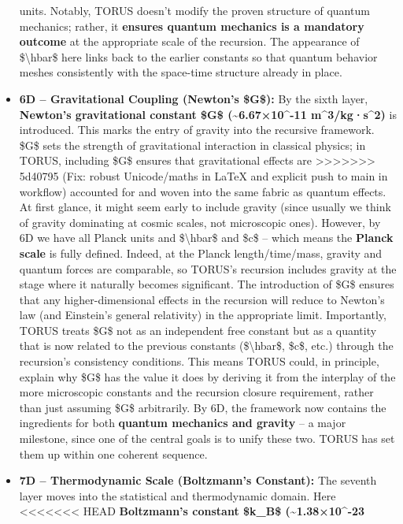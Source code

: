 \documentclass[]{article}
\begin{document}
\begin{itemize}
  units. Notably, TORUS doesn't modify the proven structure of quantum
  mechanics; rather, it \textbf{ensures quantum mechanics is a mandatory
  outcome} at the appropriate scale of the recursion. The appearance of
  \$\textbackslash{}hbar\$ here links back to the earlier constants so
  that quantum behavior meshes consistently with the space-time
  structure already in place.
\item
  \textbf{6D -- Gravitational Coupling (Newton's \$G\$):} By the sixth
  layer, \textbf{Newton's gravitational constant \$G\$
  (\textasciitilde{}6.67×10\^{}-11 m\^{}3/kg·s\^{}2)} is introduced.
  This marks the entry of gravity into the recursive framework. \$G\$
  sets the strength of gravitational interaction in classical physics;
  in TORUS, including \$G\$ ensures that gravitational effects are
>>>>>>> 5d40795 (Fix: robust Unicode/maths in LaTeX and explicit push to main in workflow)
  accounted for and woven into the same fabric as quantum effects. At
  first glance, it might seem early to include gravity (since usually we
  think of gravity dominating at cosmic scales, not microscopic ones).
  However, by 6D we have all Planck units and \$\textbackslash{}hbar\$
  and \$c\$ -- which means the \textbf{Planck scale} is fully defined.
  Indeed, at the Planck length/time/mass, gravity and quantum forces are
  comparable, so TORUS's recursion includes gravity at the stage where
  it naturally becomes significant. The introduction of \$G\$ ensures
  that any higher-dimensional effects in the recursion will reduce to
  Newton's law (and Einstein's general relativity) in the appropriate
  limit. Importantly, TORUS treats \$G\$ not as an independent free
  constant but as a quantity that is now related to the previous
  constants (\$\textbackslash{}hbar\$, \$c\$, etc.) through the
  recursion's consistency conditions. This means TORUS could, in
  principle, explain why \$G\$ has the value it does by deriving it from
  the interplay of the more microscopic constants and the recursion
  closure requirement, rather than just assuming \$G\$ arbitrarily. By
  6D, the framework now contains the ingredients for both
  \textbf{quantum mechanics and gravity} -- a major milestone, since one
  of the central goals is to unify these two. TORUS has set them up
  within one coherent sequence.
\item
  \textbf{7D -- Thermodynamic Scale (Boltzmann's Constant):} The seventh
  layer moves into the statistical and thermodynamic domain. Here
<<<<<<< HEAD
  \textbf{Boltzmann's constant \$k\_B\$ (\textasciitilde1.38×10\^{}-23
}
\end{itemize}
\end{document}
